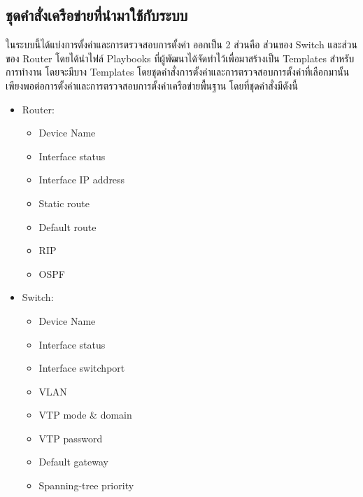 \subsection{ชุดคำสั่งเครือข่ายที่นำมาใช้กับระบบ}
\hspace{0.5in} ในระบบนี้ได้แบ่งการตั้งค่าและการตรวจสอบการตั้งค่า ออกเป็น 2 ส่วนคือ ส่วนของ Switch และส่วนของ Router โดยได้นำไฟล์ Playbooks ที่ผู้พัฒนาได้จัดทำไว้เพื่อมาสร้างเป็น Templates สำหรับการทำงาน โดยจะมีบาง Templates โดยชุดคำสั่งการตั้งค่าและการตรวจสอบการตั้งค่าที่เลือกมานั้น เพียงพอต่อการตั้งค่าและการตรวจสอบการตั้งค่าเครือข่ายพื้นฐาน โดยที่ชุดคำสั่งมีดังนี้
\begin{itemize}
  \item Router:
  \begin{itemize}
    \item Device Name
    \item Interface status
    \item Interface IP address
    \item Static route
    \item Default route
    \item RIP
    \item OSPF
  \end{itemize}
  \item Switch:
  \begin{itemize}
    \item Device Name
    \item Interface status
    \item Interface switchport
    \item VLAN
    \item VTP mode \& domain 
    \item VTP password
    \item Default gateway
    \item Spanning-tree priority
  \end{itemize}
\end{itemize}
